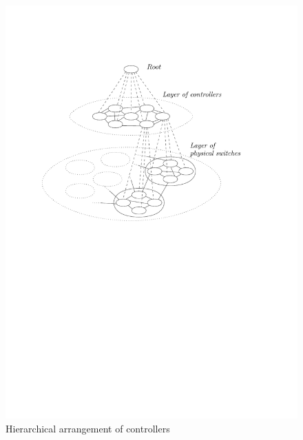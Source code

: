 \documentclass[portrait,a1]{a0poster}
\begin{document}
\begin{multicols}{2}
\begin{figure}[H]
\centering
\includegraphics[scale=1.9]{hierarchy}
\caption{Hierarchical arrangement of controllers}
\label{fig:hierarchy}
\end{figure}






\color{SaddleBrown}

\end{multicols}
\end{document}
